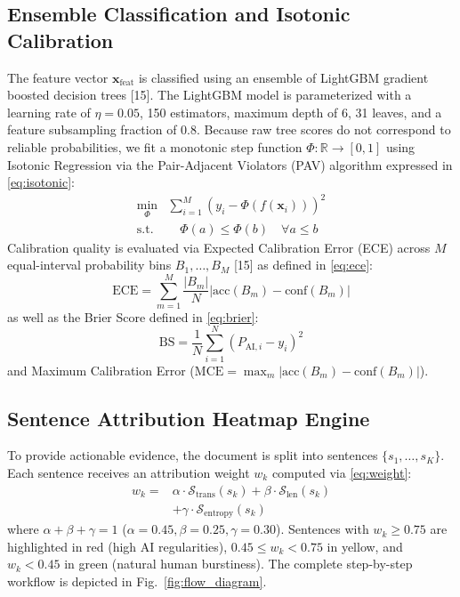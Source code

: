 \documentclass[conference]{IEEEtran}
\begin{document}
\subsection{Ensemble Classification and Isotonic Calibration}
The feature vector $\mathbf{x}_{\text{feat}}$ is classified using an ensemble of LightGBM gradient boosted decision trees [15]. The LightGBM model is parameterized with a learning rate of $\eta = 0.05$, 150 estimators, maximum depth of 6, 31 leaves, and a feature subsampling fraction of 0.8. Because raw tree scores do not correspond to reliable probabilities, we fit a monotonic step function $\Phi: \mathbb{R} \to [0, 1]$ using Isotonic Regression via the Pair-Adjacent Violators (PAV) algorithm expressed in \eqref{eq:isotonic}:
\begin{equation}
\label{eq:isotonic}
\begin{aligned}
    \min_{\Phi} & \sum_{i=1}^{M} \left( y_i - \Phi(f(\mathbf{x}_i)) \right)^2 \\
    \text{s.t.} & \quad \Phi(a) \le \Phi(b) \quad \forall a \le b
\end{aligned}
\end{equation}
Calibration quality is evaluated via Expected Calibration Error (ECE) across $M$ equal-interval probability bins $B_1, \dots, B_M$ [15] as defined in \eqref{eq:ece}:
\begin{equation}
\label{eq:ece}
    \text{ECE} = \sum_{m=1}^{M} \frac{|B_m|}{N} \left| \text{acc}(B_m) - \text{conf}(B_m) \right|
\end{equation}
as well as the Brier Score defined in \eqref{eq:brier}:
\begin{equation}
\label{eq:brier}
    \text{BS} = \frac{1}{N} \sum_{i=1}^{N} \left( P_{\text{AI}, i} - y_i \right)^2
\end{equation}
and Maximum Calibration Error ($\text{MCE} = \max_m |\text{acc}(B_m) - \text{conf}(B_m)|$).

\subsection{Sentence Attribution Heatmap Engine}
To provide actionable evidence, the document is split into sentences $\{s_1, \dots, s_K\}$. Each sentence receives an attribution weight $w_k$ computed via \eqref{eq:weight}:
\begin{equation}
\label{eq:weight}
\begin{aligned}
    w_k = {} & \alpha \cdot \mathcal{S}_{\text{trans}}(s_k) + \beta \cdot \mathcal{S}_{\text{len}}(s_k) \\
             & + \gamma \cdot \mathcal{S}_{\text{entropy}}(s_k)
\end{aligned}
\end{equation}
where $\alpha + \beta + \gamma = 1$ ($\alpha=0.45, \beta=0.25, \gamma=0.30$). Sentences with $w_k \ge 0.75$ are highlighted in red (high AI regularities), $0.45 \le w_k < 0.75$ in yellow, and $w_k < 0.45$ in green (natural human burstiness). The complete step-by-step workflow is depicted in Fig.~\ref{fig:flow_diagram}.
\end{document}

